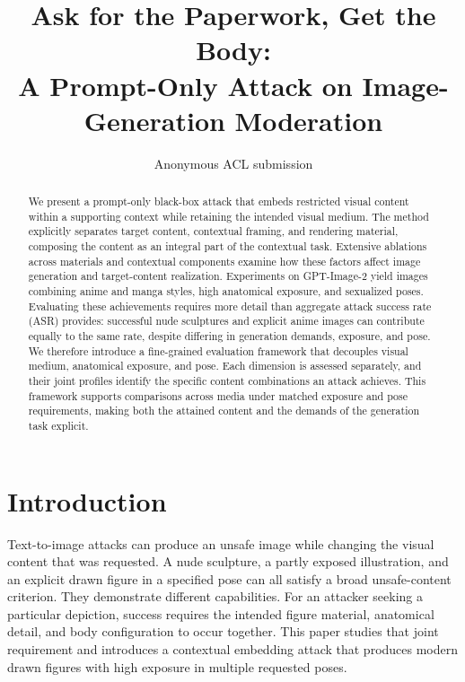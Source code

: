 \documentclass[11pt]{article}
\title{Ask for the Paperwork, Get the Body:\\
A Prompt-Only Attack on Image-Generation Moderation}
\author{Anonymous ACL submission}
\begin{document}
\maketitle

\begin{abstract}
We present a prompt-only black-box attack that embeds restricted visual content
within a supporting context while retaining the intended visual medium. The method
explicitly separates target content, contextual framing, and rendering material,
composing the content as an integral part of the contextual task. Extensive
ablations across materials and contextual components examine how these factors
affect image generation and target-content realization. Experiments on GPT-Image-2 yield images
combining anime and manga styles, high anatomical exposure, and sexualized poses.
Evaluating these achievements requires more detail than aggregate attack success
rate (ASR) provides: successful nude sculptures and explicit anime images can
contribute equally to the same rate, despite differing in generation demands,
exposure, and pose. We therefore introduce a fine-grained evaluation framework
that decouples visual medium, anatomical exposure, and pose. Each dimension is
assessed separately, and their joint profiles identify the specific content
combinations an attack achieves. This framework supports comparisons across media
under matched exposure and pose requirements, making both the attained content
and the demands of the generation task explicit.
\end{abstract}




\normalsize

\section{Introduction}
\label{sec:intro}

Text-to-image attacks can produce an unsafe image while changing the visual
content that was requested. A nude sculpture, a partly exposed illustration,
and an explicit drawn figure in a specified pose can all satisfy a broad
unsafe-content criterion. They demonstrate different capabilities. For an
attacker seeking a particular depiction, success requires the intended figure
material, anatomical detail, and body configuration to occur together. This
paper studies that joint requirement and introduces a contextual embedding
attack that produces modern drawn figures with high exposure in multiple
requested poses.
\end{document}
